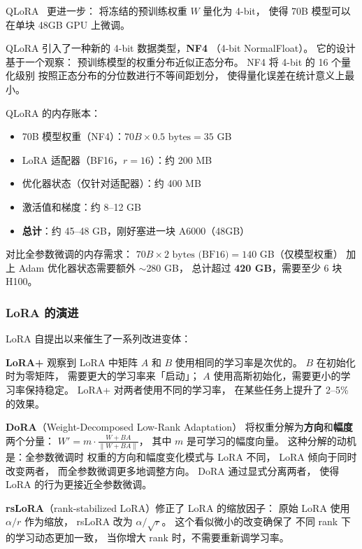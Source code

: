 QLoRA~\cite{dettmers2023qlora} 更进一步：
将冻结的预训练权重 $W$ 量化为 4-bit，
使得 70B 模型可以在单块 48GB GPU 上微调。

QLoRA 引入了一种新的 4-bit 数据类型，\textbf{NF4}
（4-bit NormalFloat）。
它的设计基于一个观察：
预训练模型的权重分布近似正态分布。
NF4 将 4-bit 的 16 个量化级别
按照正态分布的分位数进行不等间距划分，
使得量化误差在统计意义上最小。

QLoRA 的内存账本：
\begin{itemize}[noitemsep]
  \item 70B 模型权重（NF4）：$70B \times 0.5 \text{ bytes} = 35$ GB
  \item LoRA 适配器（BF16，$r=16$）：约 200 MB
  \item 优化器状态（仅针对适配器）：约 400 MB
  \item 激活值和梯度：约 8--12 GB
  \item \textbf{总计}：约 45--48 GB，刚好塞进一块 A6000（48GB）
\end{itemize}

对比全参数微调的内存需求：
$70B \times 2 \text{ bytes (BF16)} = 140$ GB（仅模型权重）
加上 Adam 优化器状态需要额外 $\sim$280 GB，
总计超过 \textbf{420 GB}，需要至少 6 块 H100。

\subsubsection{LoRA 的演进}

LoRA 自提出以来催生了一系列改进变体：

\textbf{LoRA+} 观察到 LoRA 中矩阵 $A$ 和 $B$
使用相同的学习率是次优的。
$B$ 在初始化时为零矩阵，
需要更大的学习率来「启动」；
$A$ 使用高斯初始化，需要更小的学习率保持稳定。
LoRA+ 对两者使用不同的学习率，
在某些任务上提升了 2--5\% 的效果。

\textbf{DoRA}（Weight-Decomposed Low-Rank Adaptation）
将权重分解为\textbf{方向}和\textbf{幅度}两个分量：
$W' = m \cdot \frac{W + BA}{\|W + BA\|}$，
其中 $m$ 是可学习的幅度向量。
这种分解的动机是：全参数微调时
权重的方向和幅度变化模式与 LoRA 不同，
LoRA 倾向于同时改变两者，
而全参数微调更多地调整方向。
DoRA 通过显式分离两者，
使得 LoRA 的行为更接近全参数微调。


\textbf{rsLoRA}（rank-stabilized LoRA）修正了 LoRA 的缩放因子：
原始 LoRA 使用 $\alpha / r$ 作为缩放，
rsLoRA 改为 $\alpha / \sqrt{r}$。
这个看似微小的改变确保了
不同 rank 下的学习动态更加一致，
当你增大 rank 时，不需要重新调学习率。

